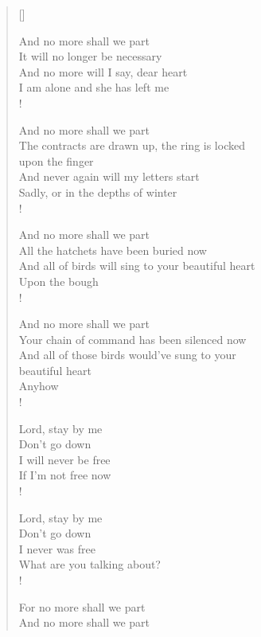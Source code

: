 \documentclass[11pt, a4paper]{article} %
\begin{document}
\begin{verse}[\versewidth]

And no more shall we part \\
It will no longer be necessary \\
And no more will I say, dear heart \\
I am alone and she has left me \\!

And no more shall we part \\
The contracts are drawn up, the ring is locked \\
upon the finger \\
And never again will my letters start \\
Sadly, or in the depths of winter \\!

And no more shall we part \\
All the hatchets have been buried now \\
And all of birds will sing to your beautiful heart \\
Upon the bough \\!

And no more shall we part \\
Your chain of command has been silenced now \\
And all of those birds would’ve sung to your \\
beautiful heart \\
Anyhow \\!

Lord, stay by me \\
Don’t go down \\
I will never be free \\
If I’m not free now \\!

Lord, stay by me \\
Don’t go down \\
I never was free \\
What are you talking about? \\!

For no more shall we part \\
And no more shall we part \\

\end{verse}
\newpage
\end{document}
